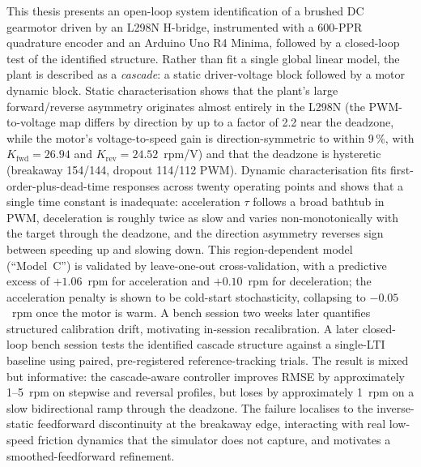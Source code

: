\documentclass[12pt, a4paper, twoside, openright]{Thesis} %
\newcommand\myemptypage{
    \null
    \thispagestyle{empty}
    \addtocounter{page}{-1}
    \newpage
    }
\begin{document}
{This thesis presents an open-loop system identification of a brushed DC gearmotor driven by an L298N H-bridge, instrumented with a 600-PPR quadrature encoder and an Arduino Uno R4 Minima, followed by a closed-loop test of the identified structure. Rather than fit a single global linear model, the plant is described as a \emph{cascade}: a static driver-voltage block followed by a motor dynamic block. Static characterisation shows that the plant's large forward/reverse asymmetry originates almost entirely in the L298N (the PWM-to-voltage map differs by direction by up to a factor of 2.2 near the deadzone, while the motor's voltage-to-speed gain is direction-symmetric to within 9\,\%, with $K_{\mathrm{fwd}}=26.94$ and $K_{\mathrm{rev}}=24.52$~rpm/V) and that the deadzone is hysteretic (breakaway 154/144, dropout 114/112 PWM). Dynamic characterisation fits first-order-plus-dead-time responses across twenty operating points and shows that a single time constant is inadequate: acceleration $\tau$ follows a broad bathtub in PWM, deceleration is roughly twice as slow and varies non-monotonically with the target through the deadzone, and the direction asymmetry reverses sign between speeding up and slowing down. This region-dependent model (``Model~C'') is validated by leave-one-out cross-validation, with a predictive excess of $+1.06$~rpm for acceleration and $+0.10$~rpm for deceleration; the acceleration penalty is shown to be cold-start stochasticity, collapsing to $-0.05$~rpm once the motor is warm. A bench session two weeks later quantifies structured calibration drift, motivating in-session recalibration. A later closed-loop bench session tests the identified cascade structure against a single-LTI baseline using paired, pre-registered reference-tracking trials. The result is mixed but informative: the cascade-aware controller improves RMSE by approximately 1--5~rpm on stepwise and reversal profiles, but loses by approximately 1~rpm on a slow bidirectional ramp through the deadzone. The failure localises to the inverse-static feedforward discontinuity at the breakaway edge, interacting with real low-speed friction dynamics that the simulator does not capture, and motivates a smoothed-feedforward refinement.
}
\newpage
\myemptypage

\end{document}
